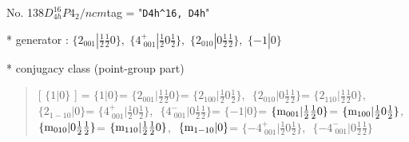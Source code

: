 \documentclass[fleqn,10pt,landscape]{jsarticle}
\begin{document}
\newpage

No. 138\quad$D_{4h}^{16}$\quad$P4_2/ncm$\quad[ tetragonal ]
tag = "{\tt D4h^16, D4h}"

* generator : $\{2{}_{001}|\frac{1}{2} \frac{1}{2} 0\},\,\,\{4^{+}_{\,\,001}|\frac{1}{2} 0 \frac{1}{2}\},\,\,\{2{}_{010}|0 \frac{1}{2} \frac{1}{2}\},\,\,\{-1|0\}$

* conjugacy class (point-group part)
\begin{quote}
[ $\{1|0\}$ ] = \quad $\{1|0\}$ = \quad $\{2{}_{001}|\frac{1}{2} \frac{1}{2} 0\}$ = \quad $\{2{}_{100}|\frac{1}{2} 0 \frac{1}{2}\}$,\,\, $\{2{}_{010}|0 \frac{1}{2} \frac{1}{2}\}$ = \quad $\{2{}_{110}|\frac{1}{2} \frac{1}{2} 0\}$,\,\, $\{2{}_{1-10}|0\}$ = \quad $\{4^{+}_{\,\,001}|\frac{1}{2} 0 \frac{1}{2}\}$,\,\, $\{4^{-}_{\,\,001}|0 \frac{1}{2} \frac{1}{2}\}$\newline[ $\{-1|0\}$ ] = \quad $\{-1|0\}$ = \quad $\{{\rm m}_{001}|\frac{1}{2} \frac{1}{2} 0\}$ = \quad $\{{\rm m}_{100}|\frac{1}{2} 0 \frac{1}{2}\}$,\,\, $\{{\rm m}_{010}|0 \frac{1}{2} \frac{1}{2}\}$ = \quad $\{{\rm m}_{110}|\frac{1}{2} \frac{1}{2} 0\}$,\,\, $\{{\rm m}_{1-10}|0\}$ = \quad $\{-4^{+}_{\,\,001}|\frac{1}{2} 0 \frac{1}{2}\}$,\,\, $\{-4^{-}_{\,\,001}|0 \frac{1}{2} \frac{1}{2}\}$\newline
\end{quote}
\end{document}
